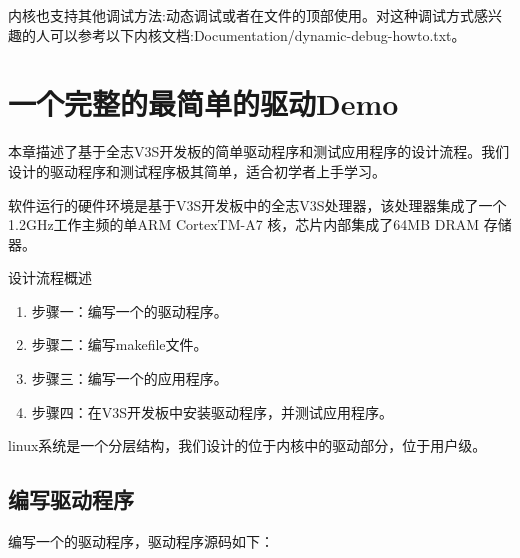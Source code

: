 \documentclass[lang=cn,newtx,10pt,scheme=chinese]{elegantbook}
\begin{document}
内核也支持其他调试方法:动态调试或者在文件的顶部使用。对这种调试方式感兴趣的人可以参考以下内核文档:Documentation/dynamic-debug-howto.txt。

\chapter{一个完整的最简单的驱动Demo}

本章描述了基于全志V3S开发板的简单驱动程序和测试应用程序的设计流程。我们设计的驱动程序和测试程序极其简单，适合初学者上手学习。

软件运行的硬件环境是基于V3S开发板中的全志V3S处理器，该处理器集成了一个1.2GHz工作主频的单ARM CortexTM-A7 核，芯片内部集成了64MB DRAM 存储器。

设计流程概述

\begin{enumerate}
    \item 步骤一：编写一个的驱动程序。
    \item 步骤二：编写makefile文件。
    \item 步骤三：编写一个的应用程序。
    \item 步骤四：在V3S开发板中安装驱动程序，并测试应用程序。
\end{enumerate}

linux系统是一个分层结构，我们设计的位于内核中的驱动部分，位于用户级。

\section{编写驱动程序}

编写一个的驱动程序，驱动程序源码如下：
\end{document}
